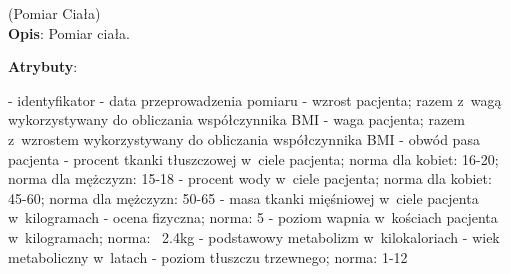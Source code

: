 \begin{enumerate}[label={\textbf{KAT/5/\protect\twodigits{\theenumi}}}, wide, labelwidth=!, labelindent=0pt, labelsep=0pt, series=reqs]
    \label{kat:BodyMeasurement} (Pomiar Ciała)\\
    \indent\textbf{Opis}: Pomiar ciała.
    \par
    \textbf{Atrybuty}:
    \begin{itemize}[series=atr, wide, align=left, leftmargin=190pt]
        \label{kat:BodyMeasurement:id}- identyfikator
        \label{kat:BodyMeasurement:completionDate}- data przeprowadzenia pomiaru
        \label{kat:BodyMeasurement:height}- wzrost pacjenta; razem z~wagą wykorzystywany do obliczania współczynnika BMI
        \label{kat:BodyMeasurement:weight}- waga pacjenta; razem z~wzrostem wykorzystywany do obliczania współczynnika BMI
        \label{kat:BodyMeasurement:waist}- obwód pasa pacjenta
        \label{kat:BodyMeasurement:percentOfFatTissue}- procent tkanki tłuszczowej w~ciele pacjenta; norma dla kobiet: 16-20; norma dla mężczyzn: 15-18
        \label{kat:BodyMeasurement:percentOfWater}- procent wody w~ciele pacjenta; norma dla kobiet: 45-60; norma dla mężczyzn: 50-65
        \label{kat:BodyMeasurement:muscleMass}- masa tkanki mięśniowej w~ciele pacjenta w~kilogramach
        \label{kat:BodyMeasurement:physicalMark}- ocena fizyczna; norma: 5
        \label{kat:BodyMeasurement:calciumInBones}- poziom wapnia w~kościach pacjenta w~kilogramach; norma: ~2.4kg
        \label{kat:BodyMeasurement:basicMetabolism}- podstawowy metabolizm w~kilokaloriach
        \label{kat:BodyMeasurement:metabolicAge}- wiek metaboliczny w~latach
        \label{kat:BodyMeasurement:visceralFatLevel}- poziom tłuszczu trzewnego; norma: 1-12
    \end{itemize}


\end{enumerate}
